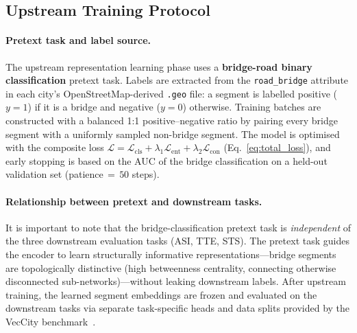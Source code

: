 

\subsection{Upstream Training Protocol}\label{subsec:upstream_protocol}

\paragraph{Pretext task and label source.}
The upstream representation learning phase uses a \textbf{bridge-road binary classification} pretext task.
Labels are extracted from the \texttt{road\_bridge} attribute in each city's OpenStreetMap-derived \texttt{.geo} file:
a segment is labelled positive ($y{=}1$) if it is a bridge and negative ($y{=}0$) otherwise.
Training batches are constructed with a balanced 1:1 positive--negative ratio by pairing every bridge segment with a uniformly sampled non-bridge segment.
The model is optimised with the composite loss $\mathcal{L} = \mathcal{L}_{\text{cls}} + \lambda_1 \mathcal{L}_{\text{ent}} + \lambda_2 \mathcal{L}_{\text{con}}$ (Eq.~\ref{eq:total_loss}),
and early stopping is based on the AUC of the bridge classification on a held-out validation set (patience$\,{=}\,50$ steps).

\paragraph{Relationship between pretext and downstream tasks.}
It is important to note that the bridge-classification pretext task is \emph{independent} of the three downstream evaluation tasks (ASI, TTE, STS).
The pretext task guides the encoder to learn structurally informative representations---bridge segments are topologically distinctive (high betweenness centrality, connecting otherwise disconnected sub-networks)---without leaking downstream labels.
After upstream training, the learned segment embeddings are frozen and evaluated on the downstream tasks via separate task-specific heads and data splits provided by the VecCity benchmark~\cite{veccity}.

